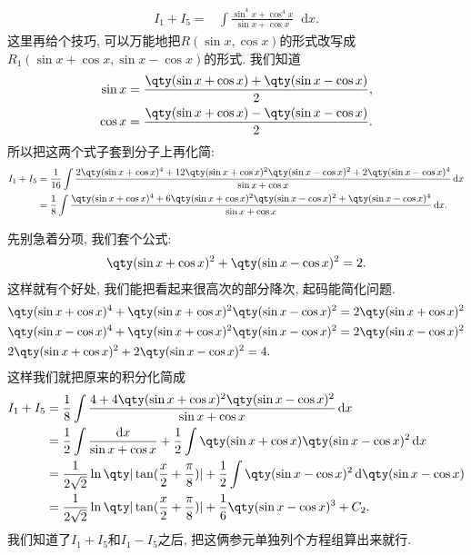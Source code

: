 \documentclass{ctexbook}
\newcommand*{\dif}{\mathop{}\!\mathrm{d}}
\begin{document}
{\begin{align*}
I_{1}+I_{5}={}&\int\frac{\sin^{4}{x}+\cos^{4}{x}}{\sin{x}+\cos{x}}\dif{x}
.\end{align*}
这里再给个技巧, 可以万能地把$R(\sin{x},\cos{x})$的形式改写成$R_{1}(\sin{x}+\cos{x},\sin{x}-\cos{x})$的形式. 我们知道
\begin{align*}
\sin{x}=\frac{\qty(\sin{x}+\cos{x})+\qty(\sin{x}-\cos{x})}{2},\\
\cos{x}=\frac{\qty(\sin{x}+\cos{x})-\qty(\sin{x}-\cos{x})}{2}
.\end{align*}
所以把这两个式子套到分子上再化简: 
\begin{align*}
I_{1}+I_{5}={}&\frac{1}{16}\int\frac{2\qty(\sin{x}+\cos{x})^{4}+12\qty(\sin{x}+\cos{x})^{2}\qty(\sin{x}-\cos{x})^{2}+2\qty(\sin{x}-\cos{x})^{4}}{\sin{x}+\cos{x}}\dif{x}\\
={}&\frac{1}{8}\int\frac{\qty(\sin{x}+\cos{x})^{4}+6\qty(\sin{x}+\cos{x})^{2}\qty(\sin{x}-\cos{x})^{2}+\qty(\sin{x}-\cos{x})^{4}}{\sin{x}+\cos{x}}\dif{x}
.\end{align*}\par
先别急着分项, 我们套个公式: 
\begin{align*}
\qty(\sin{x}+\cos{x})^{2}+\qty(\sin{x}-\cos{x})^{2}=2
.\end{align*}
这样就有个好处, 我们能把看起来很高次的部分降次, 起码能简化问题. 
\begin{align*}
{}&\qty(\sin{x}+\cos{x})^{4}+\qty(\sin{x}+\cos{x})^{2}\qty(\sin{x}-\cos{x})^{2}=2\qty(\sin{x}+\cos{x})^{2}\\
{}&\qty(\sin{x}-\cos{x})^{4}+\qty(\sin{x}+\cos{x})^{2}\qty(\sin{x}-\cos{x})^{2}=2\qty(\sin{x}-\cos{x})^{2}\\
{}&2\qty(\sin{x}+\cos{x})^{2}+2\qty(\sin{x}-\cos{x})^{2}=4
.\end{align*}
这样我们就把原来的积分化简成
\begin{align*}
I_{1}+I_{5}={}&\frac{1}{8}\int\frac{4+4\qty(\sin{x}+\cos{x})^{2}\qty(\sin{x}-\cos{x})^{2}}{\sin{x}+\cos{x}}\dif{x}\\
={}&\frac{1}{2}\int\frac{\dif{x}}{\sin{x}+\cos{x}}+\frac{1}{2}\int\qty(\sin{x}+\cos{x})\qty(\sin{x}-\cos{x})^{2}\dif{x}\\
={}&\frac{1}{2\sqrt{2}}\ln\qty|\tan(\frac{x}{2}+\frac{\pi}{8})|+\frac{1}{2}\int\qty(\sin{x}-\cos{x})^{2}\dif{\qty(\sin{x}-\cos{x})}\\
={}&\frac{1}{2\sqrt{2}}\ln\qty|\tan(\frac{x}{2}+\frac{\pi}{8})|+\frac{1}{6}\qty(\sin{x}-\cos{x})^{3}+C_{2}
.\end{align*}
我们知道了$I_{1}+I_{5}$和$I_{1}-I_{5}$之后, 把这俩参元单独列个方程组算出来就行. 
}
\end{document}
